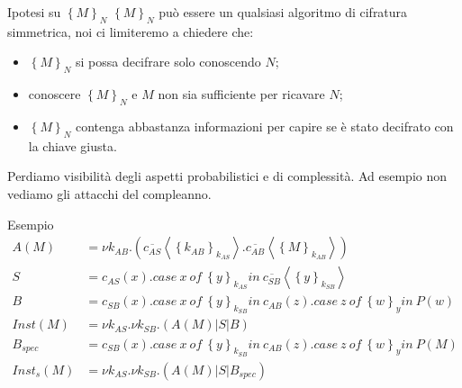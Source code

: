 \documentclass{beamer}
\theoremstyle{plain}
\theoremstyle{definition}
\theoremstyle{remark}
\newcommand{\obar}[1]{\overline{#1}}
\newcommand{\set}[1]{\left\{#1\right\}}
\newcommand{\pa}[1]{\left(#1\right)}
\newcommand{\ang}[1]{\left<#1\right>}
\begin{document}
\begin{frame}{Ipotesi su $\set{M}_N$}
  $\set{M}_N$ pu\`o essere un qualsiasi algoritmo di cifratura simmetrica,
  noi ci limiteremo a chiedere che:
  \begin{itemize}
  \item $\set{M}_N$ si possa decifrare solo conoscendo $N$;
  \item conoscere $\set{M}_N$ e $M$ non sia sufficiente per ricavare $N$;
  \item $\set{M}_N$ contenga abbastanza informazioni per capire se \`e stato
    decifrato con la chiave giusta.
  \end{itemize}
  \vfill

  Perdiamo visibilit\`a degli aspetti probabilistici e di
  complessit\`a. Ad esempio non vediamo gli attacchi del compleanno.
\end{frame}

\begin{frame}{Esempio}
  \begin{align*}
    A(M) & = \nu k_{AB}. \pa{
           \obar{c_{AS}}\ang{\set{k_{AB}}_{k_{AS}}}. \obar{c_{AB}}\ang{\set{M}_{k_{AB}}}}
    \\
    S & = c_{AS}(x).case\ x\ of\ \set{y}_{k_{AS}}in\ 
        \obar{c_{SB}}\ang{\set{y}_{k_{SB}}} \\ 
    B & = c_{SB}(x).case\ x\ of\ \set{y}_{k_{SB}}in\ c_{AB}(z). case\
        z\ of\ \set{w}_y in\ P(w) \\ 
    Inst(M) & = \nu k_{AS}. \nu k_{SB}. \pa{ A(M) | S | B } \\
    B_{spec} & = c_{SB}(x).case\ x\ of\ \set{y}_{k_{SB}}in\ 
               c_{AB}(z). case\ z\ of\ \set{w}_y in\ P(M) \\
    Inst_{s}(M) & = \nu k_{AS}. \nu k_{SB}. \pa{ A(M) | S | B_{spec}}
  \end{align*}
\end{frame}
\end{document}
